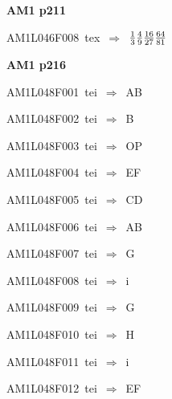 \par\vfill\eject
{\bf\hfill AM1 p211\hfill\hbox{}}\par\bigskip
{\sixrm AM1L046F008\ {\sixit tex}\ }$\Rightarrow$\ ${1\over 3} {4\over 9} {16\over 27} {64\over 81}$\par\smallskip

\par\vfill\eject
{\bf\hfill AM1 p216\hfill\hbox{}}\par\bigskip
{\sixrm AM1L048F001\ {\sixit tei}\ }$\Rightarrow$\ AB\par\smallskip
{\sixrm AM1L048F002\ {\sixit tei}\ }$\Rightarrow$\ B\par\smallskip
{\sixrm AM1L048F003\ {\sixit tei}\ }$\Rightarrow$\ OP\par\smallskip
{\sixrm AM1L048F004\ {\sixit tei}\ }$\Rightarrow$\ EF\par\smallskip
{\sixrm AM1L048F005\ {\sixit tei}\ }$\Rightarrow$\ CD\par\smallskip
{\sixrm AM1L048F006\ {\sixit tei}\ }$\Rightarrow$\ AB\par\smallskip
{\sixrm AM1L048F007\ {\sixit tei}\ }$\Rightarrow$\ G\par\smallskip
{\sixrm AM1L048F008\ {\sixit tei}\ }$\Rightarrow$\ {\tenit i}\par\smallskip
{\sixrm AM1L048F009\ {\sixit tei}\ }$\Rightarrow$\ G\par\smallskip
{\sixrm AM1L048F010\ {\sixit tei}\ }$\Rightarrow$\ H\par\smallskip
{\sixrm AM1L048F011\ {\sixit tei}\ }$\Rightarrow$\ {\tenit i}\par\smallskip
{\sixrm AM1L048F012\ {\sixit tei}\ }$\Rightarrow$\ EF\par\smallskip

